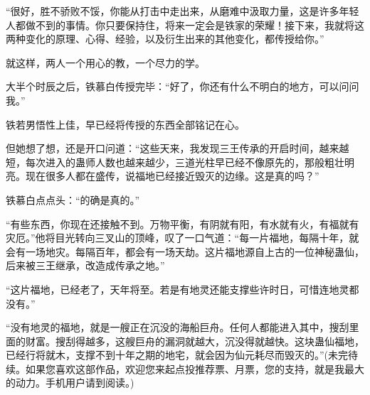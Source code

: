 \begin{this_body}
“很好，胜不骄败不馁，你能从打击中走出来，从磨难中汲取力量，这是许多年轻人都做不到的事情。你只要保持住，将来一定会是铁家的荣耀！接下来，我就将这两种变化的原理、心得、经验，以及衍生出来的其他变化，都传授给你。”

就这样，两人一个用心的教，一个尽力的学。

大半个时辰之后，铁慕白传授完毕：“好了，你还有什么不明白的地方，可以问问我。”

铁若男悟性上佳，早已经将传授的东西全部铭记在心。

但她想了想，还是开口问道：“这些天来，我发现三王传承的开启时间，越来越短，每次进入的蛊师人数也越来越少，三道光柱早已经不像原先的，那般粗壮明亮。现在很多人都在盛传，说福地已经接近毁灭的边缘。这是真的吗？”

铁慕白点点头：“的确是真的。”

“有些东西，你现在还接触不到。万物平衡，有阴就有阳，有水就有火，有福就有灾厄。”他将目光转向三叉山的顶峰，叹了一口气道：“每一片福地，每隔十年，就会有一场地灾。每隔百年，都会有一场天劫。这片福地源自上古的一位神秘蛊仙，后来被三王继承，改造成传承之地。”

“这片福地，已经老了，天年将至。若是有地灵还能支撑些许时日，可惜连地灵都没有。”

“没有地灵的福地，就是一艘正在沉没的海船巨舟。任何人都能进入其中，搜刮里面的财富。搜刮得越多，这艘巨舟的漏洞就越大，沉没得就越快。这块蛊仙福地，已经行将就木，支撑不到十年之期的地宅，就会因为仙元耗尽而毁灭的。”(未完待续。如果您喜欢这部作品，欢迎您来起点投推荐票、月票，您的支持，就是我最大的动力。手机用户请到阅读。)

\end{this_body}

